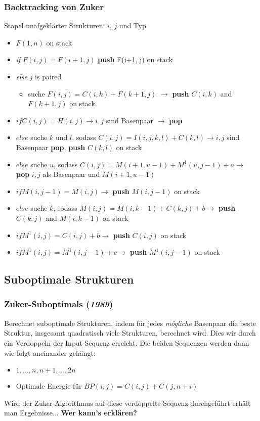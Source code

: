 \subsubsection{Backtracking von Zuker}
Stapel unafgekl\"arter Strukturen: $i$, $j$ und Typ
\begin{itemize}
\item[]$F(1,n)$ on stack
\item[]\textit{if} $F(i,j)=F(i+1, j)$ \textbf{push} F(i+1, j) on stack
\item[]\textit{else} $j$ is paired
	\begin{itemize}
	\item[]suche $F(i, j)=C(i,k) + F(k+1,j)$ $\rightarrow$ \textbf{push} $C(i, k)$ and $F(k+1, j)$ on stack
	\end{itemize}
\item[]$if C(i,j)=H(i,j) \rightarrow i, j$ sind Basenpaar $\rightarrow$ \textbf{pop}
\item[]$else$ suche $k$ und $l$, sodass $C(i,j) = I(i,j,k, l) + C(k,l) \rightarrow  i, j$ sind Basenpaar \textbf{pop}, \textbf{push} $C(k,l)$ on stack
\item[]$else$ suche $u$, sodass $C(i,j)=M(i+1,u-1)+M^1(u,j-1)+a  \rightarrow$ \textbf{pop}  $i, j$ als Basenpaar und $M(i+1,u-1)$
\item[]$if M(i,j-1)=M(i,j) \rightarrow$ \textbf{push} $M(i,j-1)$ on stack
\item[]$else$ suche $k$, sodass $M(i,j)=M(i, k-1)+C(k,j)+b \rightarrow$ \textbf{push} $C(k,j)$ and $M(i,k-1)$ on stack
\item[]$if M^1(i,j) = C(i,j)+b \rightarrow$ \textbf{push} $C(i,j)$ on stack
\item[]$if  M^1(i,j) = M^1(i,j-1)+c \rightarrow$ \textbf{push} $M^1(i,j-1)$ on stack
\end{itemize}


\subsection{Suboptimale Strukturen}

\subsubsection{ Zuker-Suboptimals (\textit{1989})}
Berechnet suboptimale Strukturen, indem für jedes \textit{m\"ogliche} Basenpaar die beste Struktur, insgesamt quadratisch viele Strukturen, berechnet wird. Dies wir durch ein Verdoppeln der Input-Sequenz erreicht. Die beiden Sequenzen werden dann wie folgt aneinander geh\"angt:
\begin{itemize}
\item[]$1, .. .,n, n+1, ..., 2n$
\item[]Optimale Energie f\"ur $BP(i,j)=C(i,j)+C(j, n+i)$
\end{itemize}
Wird der Zuker-Algorithmus auf diese verdoppelte Sequenz durchgef\"uhrt erh\"alt man Ergebnisse...\textbf{ Wer kann's erkl\"aren?}

